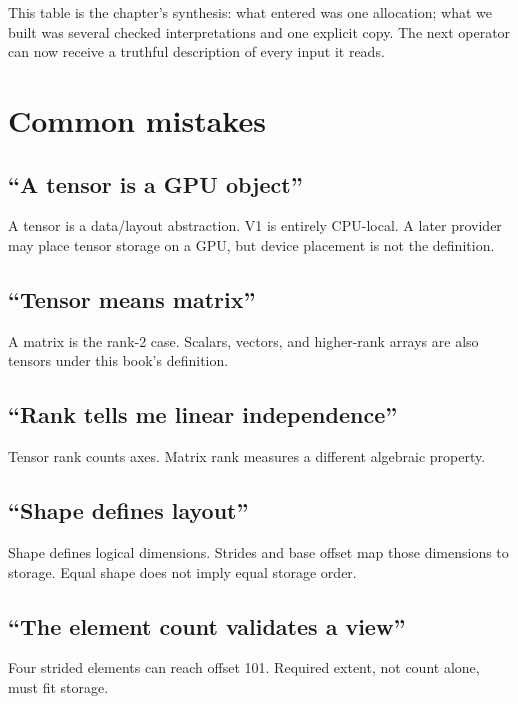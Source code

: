 This table is the chapter's synthesis: what entered was one allocation;
what we built was several checked interpretations and one explicit copy.
The next operator can now receive a truthful description of every input
it reads.

\section{Common mistakes}\label{common-mistakes-4}

\subsection{``A tensor is a GPU
object''}\label{a-tensor-is-a-gpu-object}

A tensor is a data/layout abstraction. V1 is entirely CPU-local. A later
provider may place tensor storage on a GPU, but device placement is not
the definition.

\subsection{``Tensor means matrix''}\label{tensor-means-matrix}

A matrix is the rank-2 case. Scalars, vectors, and higher-rank arrays
are also tensors under this book's definition.

\subsection{``Rank tells me linear
independence''}\label{rank-tells-me-linear-independence}

Tensor rank counts axes. Matrix rank measures a different algebraic
property.

\subsection{``Shape defines layout''}\label{shape-defines-layout}

Shape defines logical dimensions. Strides and base offset map those
dimensions to storage. Equal shape does not imply equal storage order.

\subsection{``The element count validates a
view''}\label{the-element-count-validates-a-view}

Four strided elements can reach offset 101. Required extent, not count
alone, must fit storage.

